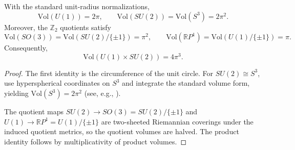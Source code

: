 \begin{lemma}
\label{lem:group_volumes}
With the standard unit-radius normalizations,
\begin{equation}
    \mathrm{Vol}(U(1))=2\pi,\qquad
    \mathrm{Vol}(SU(2))=\mathrm{Vol}(S^3)=2\pi^2.
\end{equation}
Moreover, the $\mathbb{Z}_2$ quotients satisfy
\begin{equation}
    \mathrm{Vol}(SO(3))=\mathrm{Vol}(SU(2)/\{\pm 1\})=\pi^2,\qquad
    \mathrm{Vol}(\mathbb{R}P^1)=\mathrm{Vol}(U(1)/\{\pm 1\})=\pi.
\end{equation}
Consequently,
\begin{equation}
    \mathrm{Vol}(U(1)\times SU(2))=4\pi^3.
\end{equation}
\end{lemma}
\begin{proof}
The first identity is the circumference of the unit circle. For $SU(2)\cong S^3$, use hyperspherical coordinates on $S^3$ and integrate the standard volume form, yielding $\mathrm{Vol}(S^3)=2\pi^2$ (see, e.g., \cite{Nakahara2003}).
\par
\noindent
The quotient maps $SU(2)\to SO(3)=SU(2)/\{\pm 1\}$ and $U(1)\to \mathbb{R}P^1=U(1)/\{\pm 1\}$ are two-sheeted Riemannian coverings under the induced quotient metrics, so the quotient volumes are halved. The product identity follows by multiplicativity of product volumes.
\end{proof}

